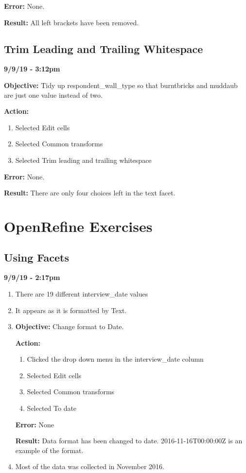 \documentclass{article}
\begin{document}
\textbf{Error:} None.

\textbf{Result:} All left brackets have been removed.

\subsection{Trim Leading and Trailing Whitespace}

\textbf{9/9/19 - 3:12pm}

\textbf{Objective:} Tidy up respondent\_wall\_type so that burntbricks and muddaub are just one value instead of two.

\textbf{Action:}

\begin{enumerate}
    \item Selected Edit cells
    \item Selected Common transforms
    \item Selected Trim leading and trailing whitespace
\end{enumerate}

\textbf{Error:} None.

\textbf{Result:} There are only four choices left in the text facet.

\newpage
\section{OpenRefine Exercises}

\subsection{Using Facets}

\textbf{9/9/19 - 2:17pm}

\begin{enumerate}
    \item There are 19 different interview\_date values
    \item It appears as it is formatted by Text.
    \item \textbf{Objective:} Change format to Date.
    
    \textbf{Action:}
    \begin{enumerate}
        \item Clicked the drop down menu in the interview\_date column
        \item Selected Edit cells
        \item Selected Common transforms
        \item Selected To date
    \end{enumerate}
    
    \textbf{Error:} None
    
    \textbf{Result:} Data format has been changed to date. 2016-11-16T00:00:00Z is an example of the format.
    \item Most of the data was collected in November 2016.
\end{enumerate}
\end{document}
